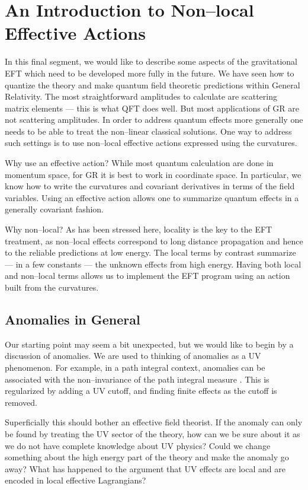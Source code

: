 \documentclass[11pt,a4paper]{article}
\begin{document}
\section{An Introduction to Non--local Effective Actions}
\label{sec:anomalies}

In this final segment, we would like to describe some aspects of the gravitational EFT which need to be developed more fully in the future. We have seen how to quantize the theory and make quantum field theoretic predictions within General Relativity. The most straightforward amplitudes to calculate are scattering matrix elements --- this is what QFT does well. But most applications of GR are not scattering amplitudes. In order to address quantum effects more generally one needs to be able to treat the non--linear classical solutions. One way to address such settings is to use non--local effective actions expressed using the curvatures.

Why use an effective action? While most quantum calculation are done in momentum space, for GR it is best to work in coordinate space. In particular, we know how to write the curvatures and covariant derivatives in terms of the field variables. Using an effective action allows one to summarize quantum effects in a generally covariant fashion.

Why non--local? As has been stressed here, locality is the key to the EFT treatment, as non--local effects correspond to long distance propagation and hence to the reliable predictions at low energy. The local terms by contrast summarize --- in a few constants --- the unknown effects from high energy. Having both local and non--local terms allows us to implement the EFT program using an action built from the curvatures.

\subsection{Anomalies in General}

Our starting point may seem a bit unexpected, but we would like to begin by a discussion of anomalies. We are used to thinking of anomalies as a UV phenomenon. For example, in a path integral context, anomalies can be associated with the non--invariance of the path integral measure \cite{Fujikawa:1980vr}. This is regularized by adding a UV cutoff, and finding finite effects as the cutoff is removed.

Superficially this should bother an effective field theorist. If the anomaly can only be found by treating the UV sector of the theory, how can we be sure about it as we do not have complete knowledge about UV physics? Could we change something about the high energy part of the theory and make the anomaly go away? What has happened to the argument that UV effects are local and are encoded in local effective Lagrangians?
\end{document}
